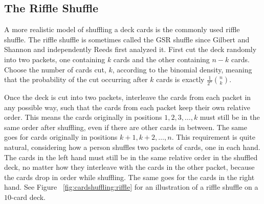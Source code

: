 \documentclass[12pt]{article}
\begin{document}
\subsection*{The Riffle Shuffle}

A more realistic model of shuffling a deck cards is the commonly used 
{riffle shuffle}.%
The riffle shuffle is sometimes called the GSR shuffle since Gilbert and
Shannon and independently Reeds first analyzed it.  First cut the deck
randomly into two packets, one containing \( k \) cards and the other
containing \( n-k \) cards.  Choose the number of cards cut, \( k \),
according to the binomial density, meaning that the probability of the
cut occurring after \( k \) cards is exactly \( \frac{1}{2^n}\binom{n}{k}
\).

Once the deck is cut into two packets, interleave the cards from each
packet in any possible way, such that the cards from each packet keep
their own relative order.  This means the cards originally in positions \(
1, 2, 3, \dots, k \) must still be in the same order after shuffling,
even if there are other cards in between.  The same goes for cards
originally in positions \( k+1, k+2, \dots, n \).  This requirement is
quite natural, considering how a person shuffles two packets of cards,
one in each hand.  The cards in the left hand must still be in the same
relative order in the shuffled deck, no matter how they interleave with
the cards in the other packet, because the cards drop in order while
shuffling.  The same goes for the cards in the right hand. See Figure~%
\ref{fig:cardshuffling:riffle} for an illustration of a riffle shuffle
on a \( 10 \)-card deck.
\end{document}
